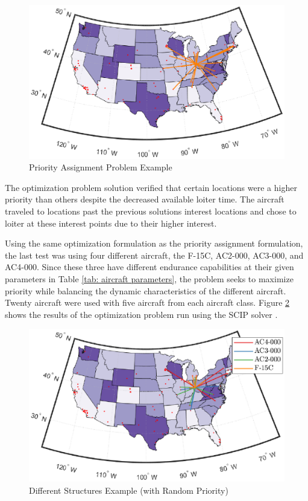 \begin{figure}[H]
    \centering
    \includegraphics{Thesis/Method_II/priorityAP.eps}
    \caption{Priority Assignment Problem Example}
    \label{fig:priorityAP}
\end{figure}
The optimization problem solution verified that certain locations were a higher priority than others despite the decreased available loiter time. The aircraft traveled to locations past the previous solutions interest locations and chose to loiter at these interest points due to their higher interest.\par
Using the same optimization formulation as the priority assignment formulation, the last test was using four different aircraft, the F-15C, AC2-000, AC3-000, and AC4-000. Since these three have different endurance capabilities at their given parameters in Table \ref{tab: aircraft parameters}, the problem seeks to maximize priority while balancing the dynamic characteristics of the different aircraft. Twenty aircraft were used with five aircraft from each aircraft class. Figure \ref{fig:diffStructuresAP} shows the results of the optimization problem run using the SCIP solver \cite{scip}.
\begin{figure}[H]
    \centering
    \includegraphics{Thesis/Method_II/diffStructuresAP.eps}
    \caption{Different Structures Example (with Random Priority)}
    \label{fig:diffStructuresAP}
\end{figure}

